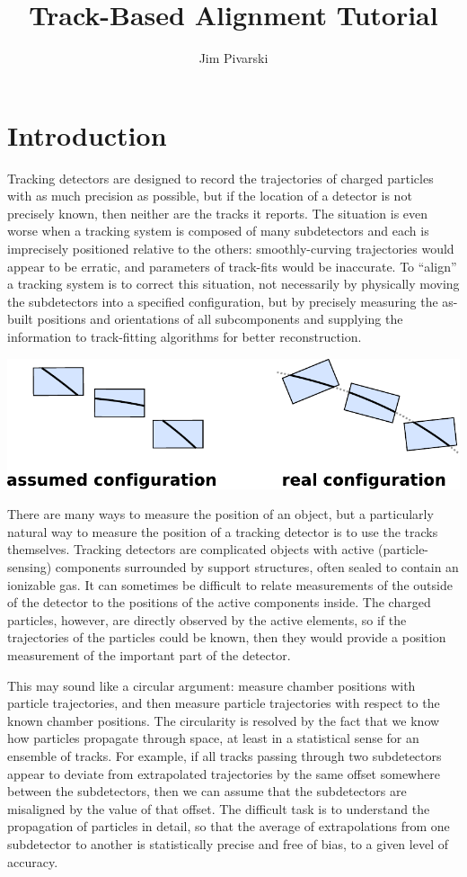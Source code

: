 \documentclass[12pt]{article}
\title{\huge \bf Track-Based Alignment Tutorial}
\author{Jim Pivarski}
\begin{document}
\maketitle

\section{Introduction}
\label{sec:introduction}

Tracking detectors are designed to record the trajectories of charged
particles with as much precision as possible, but if the location of a
detector is not precisely known, then neither are the tracks it
reports.  The situation is even worse when a tracking system is
composed of many subdetectors and each is imprecisely positioned
relative to the others: smoothly-curving trajectories would appear to
be erratic, and parameters of track-fits would be inaccurate.  To
``align'' a tracking system is to correct this situation, not
necessarily by physically moving the subdetectors into a specified
configuration, but by precisely measuring the as-built positions and
orientations of all subcomponents and supplying the information to
track-fitting algorithms for better reconstruction.

\begin{center}
\includegraphics[width=0.65\linewidth]{PLOTS/why_alignment_is_important.pdf}
\end{center}

There are many ways to measure the position of an object, but a
particularly natural way to measure the position of a tracking
detector is to use the tracks themselves.  Tracking detectors are
complicated objects with active (particle-sensing) components
surrounded by support structures, often sealed to contain an ionizable
gas.  It can sometimes be difficult to relate measurements of the
outside of the detector to the positions of the active components
inside.  The charged particles, however, are directly observed by the
active elements, so if the trajectories of the particles could be
known, then they would provide a position measurement of the important part
of the detector.

This may sound like a circular argument: measure chamber positions
with particle trajectories, and then measure particle trajectories
with respect to the known chamber positions.  The circularity is
resolved by the fact that we know how particles propagate through
space, at least in a statistical sense for an ensemble of tracks.  For
example, if all tracks passing through two subdetectors appear to
deviate from extrapolated trajectories by the same offset
somewhere between the subdetectors, then we can assume that the
subdetectors are misaligned by the value of that offset.  The
difficult task is to understand the propagation of particles in
detail, so that the average of extrapolations from one subdetector to
another is statistically precise and free of bias, to a given level of
accuracy.
\end{document}
